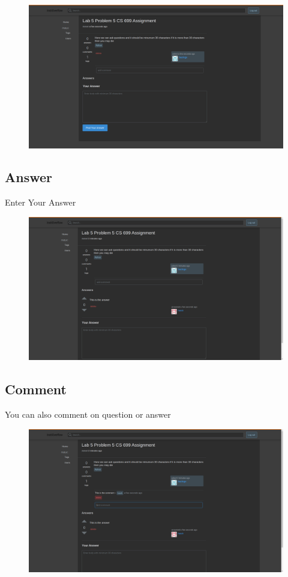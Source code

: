 \documentclass[12pt]{article}
\begin{document}
\begin{figure}[H]
\begin{center}
\includegraphics[width=0.75\columnwidth]{Viewquestion}
\end{center}
\end{figure}


\subsection{Answer}
Enter Your Answer\\


\begin{figure}[H]
\begin{center}
\includegraphics[width=0.75\columnwidth]{Answer}
\end{center}
\end{figure}

\subsection{Comment}
You can also comment on question or answer\\


\begin{figure}[H]
\begin{center}
\includegraphics[width=0.75\columnwidth]{Comment}
\end{center}
\end{figure}
\end{document}

